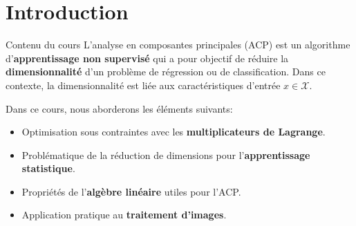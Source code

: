 \section[Introduction]{Introduction}

\begin{frame}{Contenu du cours}
	L'analyse en composantes principales (ACP) est un algorithme d'\textbf{apprentissage non supervisé} qui a pour objectif de réduire la \textbf{dimensionnalité} d'un problème de régression ou de classification. Dans ce contexte, la dimensionnalité est liée aux caractéristiques d'entrée $x \in \mathcal{X}$.
	\vspace{0.5cm}
	
	Dans ce cours, nous aborderons les éléments suivants:
	\begin{itemize}
		\pause
		\item Optimisation sous contraintes avec les \textbf{multiplicateurs de Lagrange}.
		\pause
		\item Problématique de la réduction de dimensions pour l'\textbf{apprentissage statistique}.
		\pause
		\item Propriétés de l'\textbf{algèbre linéaire} utiles pour l'ACP.
		\pause
		\item Application pratique au \textbf{traitement d'images}.
	\end{itemize}
\end{frame}
